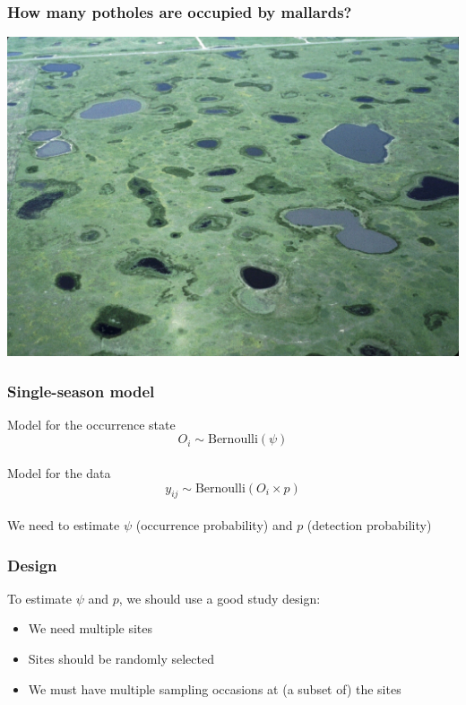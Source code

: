\documentclass[color=usenames,dvipsnames]{beamer}\usepackage[]{graphicx}\usepackage[]{xcolor}
\begin{document}
\begin{frame}
  \frametitle{\normalsize How many potholes are occupied by mallards?}
  \begin{center}
    \includegraphics[width=\textwidth]{figs/Prairie_Pothole_Wetlands}
  \end{center}
\end{frame}





\begin{frame}
  \frametitle{Single-season model}
  \large
  {\centering Model for the occurrence state}
  \[
    O_{i} \sim \mbox{Bernoulli}(\psi)
  \] \\
  \pause
  \vspace{0.4cm}
  {\centering Model for the data}
  \[
    y_{ij} \sim \mbox{Bernoulli}(O_i \times p)
  \] \\
  \pause
  \vspace{0.5cm}
  We need to estimate $\psi$ (occurrence probability) and $p$ (detection probability)
\end{frame}





\begin{frame}
  \frametitle{Design}
  \large
  To estimate $\psi$ and $p$, we should use a good study design:
  \begin{itemize}[<+->]
    \item We need multiple sites
    \item Sites should be randomly selected
    \item We must have multiple sampling occasions at (a subset of) the sites
  \end{itemize}
\end{frame}
\end{document}
